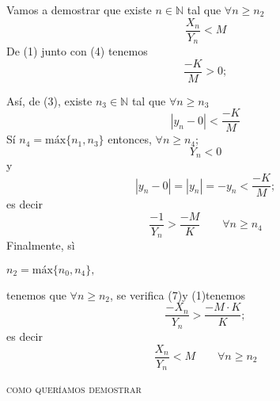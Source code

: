 \documentclass[a4paper, 10pt]{article}
\begin{document}
Vamos a demostrar que existe \(n \in \mathbb{N}\) tal que \( \forall n \geq n_2\)\\
\begin{equation*}
\dfrac{X_n}{Y_n} < M
\end{equation*}
De (1) junto con (4) tenemos 
\begin{equation}
\dfrac{-K}{M} > 0 ;
\end{equation}

Así, de (3), existe \(n_3 \in \mathbb{N}\) tal que \(\forall n \geq n_3 \)\\
\begin{equation}
|y_n - 0 | < \dfrac{-K}{M}
\end{equation}
Sí
\( n_4 = \text{máx} \lbrace n_1,n_3 \rbrace \)
entonces, \(\forall n\geq n_4 ;\)
\begin{equation*}
Y_n < 0
\end{equation*}
y
\begin{equation*}
|y_n - 0 | = |y_n| = - y_n < \dfrac{-K}{M};
\end{equation*}
es decir\\
\begin{equation}
\dfrac{-1}{Y_n}> \dfrac{-M}{K} \qquad \forall n\geq  n_4
\end{equation}
Finalmente, sì
\begin{center}
\(n_2 = \text{máx} \lbrace n_0,n_4 \rbrace ,\)
\end{center}
tenemos que \(\forall n\geq n_2\), se verifica (7)y (1)tenemos
\begin{equation*}
\dfrac{-X_n}{Y_n}> \dfrac{-M \cdot K}{K};
\end{equation*}
es decir 
\begin{equation*}
\dfrac{X_n}{Y_n} < M \qquad \forall n \geq n_2
\end{equation*}
\begin{flushright}
\textsc{como queríamos demostrar}
\end{flushright}
\end{document}
